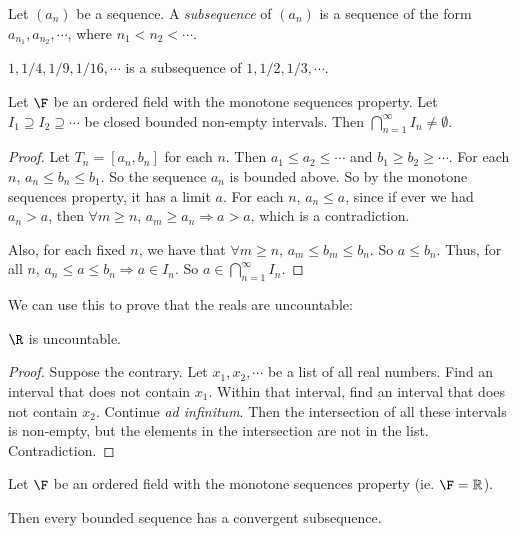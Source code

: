 \documentclass[a4paper]{article}
\begin{document}
\begin{defi}[Subsequence]
  Let $(a_n)$ be a sequence. A \emph{subsequence} of $(a_n)$ is a sequence of the form $a_{n_1}, a_{n_2}, \cdots$, where $n_1 < n_2 < \cdots$.
\end{defi}

\begin{eg}
  $1, 1/4, 1/9, 1/16, \cdots$ is a subsequence of $1, 1/2, 1/3, \cdots$.
\end{eg}

\begin{lemma}
  Let $\F$ be an ordered field with the monotone sequences property. Let $I_1\supseteq I_2 \supseteq \cdots$ be closed bounded non-empty intervals. Then $\bigcap_{n = 1}^\infty I_n \neq \emptyset$.
\end{lemma}

\begin{proof}
  Let $T_n = [a_n, b_n]$ for each $n$. Then $a_1 \leq a_2 \leq\cdots$ and $b_1 \geq b_2\geq \cdots$. For each $n$, $a_n \leq b_n \leq b_1$. So the sequence $a_n$ is bounded above. So by the monotone sequences property, it has a limit $a$. For each $n$, $a_n\leq a$, since if ever we had $a_n > a$, then $\forall m \geq n$, $a_m \geq a_n\Rightarrow a > a$, which is a contradiction.

  Also, for each fixed $n$, we have that $\forall m\geq n$, $a_m \leq b_m \leq b_n$. So $a \leq b_n$. Thus, for all $n$, $a_n \leq a \leq b_n \Rightarrow a\in I_n$. So $a\in \bigcap_{n = 1}^\infty I_n$.
\end{proof}

We can use this to prove that the reals are uncountable:
\begin{prop}
  $\R$ is uncountable.
\end{prop}

\begin{proof}
  Suppose the contrary. Let $x_1, x_2, \cdots$ be a list of all real numbers. Find an interval that does not contain $x_1$. Within that interval, find an interval that does not contain $x_2$. Continue \emph{ad infinitum}. Then the intersection of all these intervals is non-empty, but the elements in the intersection are not in the list. Contradiction.
\end{proof}

\begin{thm}
  Let $\F$ be an ordered field with the monotone sequences property (ie. $\F = \mathbb{R}$).

  Then every bounded sequence has a convergent subsequence.
\end{thm}
\end{document}
